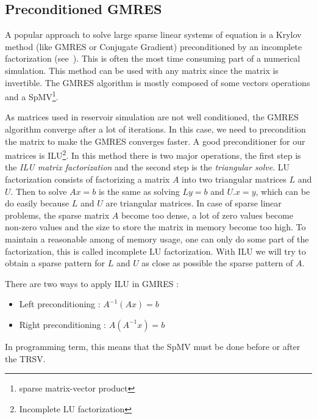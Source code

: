 \subsection{Preconditioned GMRES}
A popular approach to solve large sparse linear systems of equation is a Krylov method (like GMRES or Conjugate Gradient) preconditioned by an incomplete factorization (see~\cite{Saad96IMSLS}).
%
This is often the most time consuming part of a numerical simulation.
%
This method can be used with any matrix since the matrix is invertible.
%
The GMRES algorithm is mostly composed of some vectors operations and a SpMV\footnote{sparse matrix-vector product}.

As matrices used in reservoir simulation are not well conditioned, the GMRES algorithm converge after a lot of iterations.
%
In this case, we need to precondition the matrix to make the GMRES converges faster.
%
A good preconditioner for our matrices is ILU\footnote{Incomplete LU factorization}.
%
In this method there is two major operations, the first step is the {\em ILU matrix factorization} and the second step is the {\em triangular solve}.
%
LU factorization consists of factorizing a matrix $A$ into two triangular matrices $L$ and $U$.
%
Then to solve $Ax=b$ is the same as solving $Ly=b$ and $U.x=y$, which can be do easily because $L$ and $U$ are triangular matrices.
%
In case of sparse linear problems, the sparse matrix $A$ become too dense, a lot of zero values become non-zero values and the size to store the matrix in memory become too high.
%
To maintain a reasonable among of memory usage, one can only do some part of the factorization, this is called incomplete LU factorization.
%
With ILU we will try to obtain a sparse pattern for $L$ and $U$ as close as possible the sparse pattern of $A$.

There are two ways to apply ILU in GMRES :
\begin{itemize}
  \item Left preconditioning : $A^{-1}(Ax)=b$
  \item Right preconditioning : $A(A^{-1}x)=b$
\end{itemize}

In programming term, this means that the SpMV must be done before or after the TRSV.
